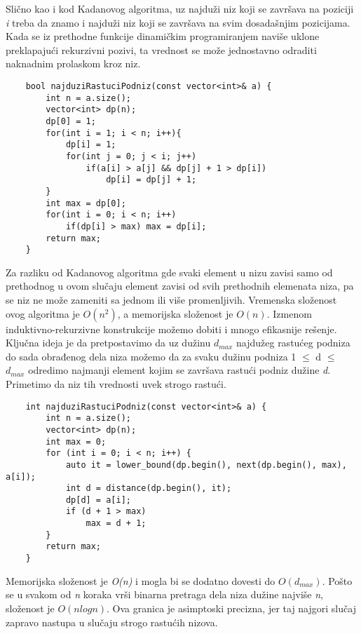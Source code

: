 \documentclass{article}
\begin{document}
Slično kao i kod Kadanovog algoritma, uz najduži niz koji se završava na
poziciji \textit{i} treba da znamo i najduži niz koji se završava na svim dosadašnjim
pozicijama. Kada se iz prethodne funkcije dinamičkim programiranjem naviše
uklone preklapajući rekurzivni pozivi, ta vrednost se može jednostavno odraditi
naknadnim prolaskom kroz niz.
\begin{lstlisting}
    bool najduziRastuciPodniz(const vector<int>& a) {
        int n = a.size();
        vector<int> dp(n);
        dp[0] = 1;
        for(int i = 1; i < n; i++){
            dp[i] = 1;
            for(int j = 0; j < i; j++)
                if(a[i] > a[j] && dp[j] + 1 > dp[i])
                    dp[i] = dp[j] + 1;
        }
        int max = dp[0];
        for(int i = 0; i < n; i++)
            if(dp[i] > max) max = dp[i];
        return max;
    }
\end{lstlisting}
Za razliku od Kadanovog algoritma gde svaki element u nizu zavisi samo od
prethodnog u ovom slučaju element zavisi od svih prethodnih elemenata niza,
pa se niz ne može zameniti sa jednom ili više promenljivih. Vremenska složenost
ovog algoritma je $O(n^2)$, a memorijska složenost je $O(n)$. Izmenom induktivno-rekurzivne konstrukcije možemo dobiti i mnogo efikasnije rešenje. Ključna ideja je da pretpostavimo da uz dužinu $d_{max}$ najdužeg rastućeg podniza do sada obrađenog dela
niza možemo da za svaku dužinu podniza 1 $\leq$ d $\leq$ $d_{max}$ odredimo
najmanji element kojim se završava rastući podniz dužine \textit{d}. Primetimo da niz
tih vrednosti uvek strogo rastući.
\begin{lstlisting}
    int najduziRastuciPodniz(const vector<int>& a) {
        int n = a.size();
        vector<int> dp(n);
        int max = 0;
        for (int i = 0; i < n; i++) {
            auto it = lower_bound(dp.begin(), next(dp.begin(), max), a[i]);
            int d = distance(dp.begin(), it);
            dp[d] = a[i];
            if (d + 1 > max)
                max = d + 1;
        }
        return max;
    }
\end{lstlisting}
Memorijska složenost je \textit{O(n)} i mogla bi se dodatno dovesti do $O(d_{max})$. Pošto se
u svakom od \textit{n} koraka vrši binarna pretraga dela niza dužine najviše \textit{n}, složenost
je $O(nlogn)$. Ova granica je asimptoski precizna, jer taj najgori slučaj zapravo
nastupa u slučaju strogo rastućih nizova.
\end{document}
